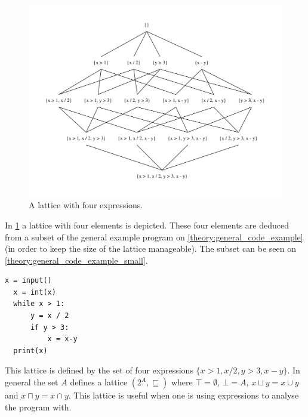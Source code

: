 \begin{figure}
\begin{center}
\includegraphics[width=\textwidth]{figures/dot_files/lattice_example.pdf}
\end{center}
\caption{A lattice with four expressions.}
\label{lattice_example}
\end{figure}

In \cref{lattice_example} a lattice with four elements is depicted.
These four elements are deduced from a subset of the general example program on \cref{theory:general_code_example}(in order to keep the size of the lattice manageable).
The subset can be seen on \cref{theory:general_code_example_small}.

\begin{lstlisting}[style=python, caption={The general code example used throughout the theory chapter.}, label={theory:general_code_example_small}]
  x = input()
  x = int(x)
  while x > 1:
      y = x / 2
      if y > 3:
          x = x-y
  print(x)
\end{lstlisting}

This lattice is defined by the set of four expressions $\{x > 1, x / 2, y > 3, x - y \}$.
In general the set $A$ defines a lattice $(2^A, \sqsubseteq )$ where $\top = \emptyset$, $\bot = A$, $x\sqcup y = x \cup y$ and $x \sqcap y = x \cap y$.
This lattice is useful when one is using expressions to analyse the program with.

